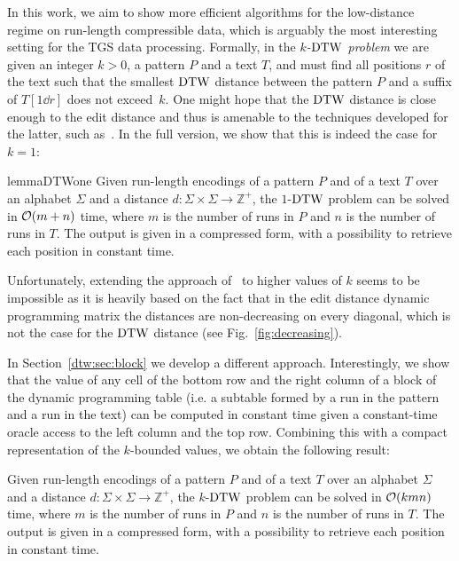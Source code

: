 In this work, we aim to show more efficient algorithms for the low-distance regime on run-length compressible data, which is arguably the most interesting setting for the TGS data processing. Formally, in the \emph{$k$-$\mathrm{DTW}$ problem} we are given an integer $k > 0$, a pattern $P$ and a text $T$, and must find all positions $r$ of the text such that the smallest $\mathrm{DTW}$ distance between the pattern $P$ and a suffix of $T[1 \dd r]$ does not exceed~$k$. One might hope that the $\mathrm{DTW}$ distance is close enough to the edit distance and thus is amenable to the techniques developed for the latter, such as~\cite{LMS98,LV97}. In the full version, we show that this is indeed the case for $k = 1$:

\begin{restatable}{lemma}{DTWone}
\label{lm:1-DTW}
Given run-length encodings of a pattern $P$ and of a text $T$ over an alphabet $\Sigma$ and a distance $d: \Sigma \times \Sigma \rightarrow \mathbb{Z}^+$, the $1$-$\mathrm{DTW}$ problem can be solved in $\mathcal{O}(m+n)$ time, where $m$ is the number of runs in $P$ and $n$ is the number of runs in $T$. The output is given in a compressed form, with a possibility to retrieve each position in constant time.
\end{restatable}

Unfortunately, extending the approach of~\cite{LMS98,LV97} to higher values of $k$ seems to be impossible as it is heavily based on the fact that in the edit distance dynamic programming matrix the distances are non-decreasing on every diagonal, which is not the case for the $\mathrm{DTW}$ distance (see Fig.~\ref{fig:decreasing}). 

In Section~\ref{dtw:sec:block} we develop a different approach. Interestingly, we show that the value of any cell of the bottom row and the right column of a block of the dynamic programming table (i.e. a subtable formed by a run in the pattern and a run in the text) can be computed in constant time given a constant-time oracle access to the left column and the top row. Combining this with a compact representation of the $k$-bounded values, we obtain the following result:

\begin{theorem}\label{th:block}
Given run-length encodings of a pattern $P$ and of a text $T$ over an alphabet $\Sigma$ and a distance $d: \Sigma \times \Sigma \rightarrow \mathbb{Z}^+$, the $k$-$\mathrm{DTW}$ problem can be solved in $\mathcal{O}(k mn)$ time, where $m$ is the number of runs in $P$ and $n$ is the number of runs in $T$. The output is given in a compressed form, with a possibility to retrieve each position in constant time.
\end{theorem}


